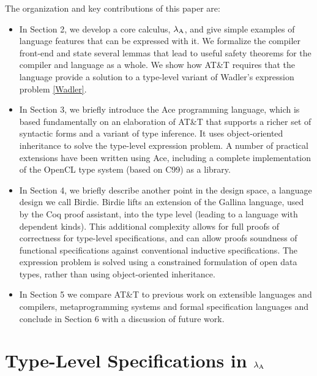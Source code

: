\documentclass[9pt]{sigplanconf}
\begin{document}
The organization and key contributions of this paper are:
\begin{itemize}
\item In Section 2, we develop a core calculus, $\lambda_{\text{A}}$, and give simple examples of language features that can be expressed with it. We formalize the compiler front-end and state several lemmas that lead to useful safety theorems for the compiler and language as a whole.  We show how AT\&T requires that the language provide a solution to a type-level variant of Wadler's expression problem \ref{Wadler}. 
\item In Section 3, we briefly introduce the Ace programming language, which is based fundamentally on an  elaboration of AT\&T that supports a richer set of syntactic forms and a variant of type inference. It uses object-oriented inheritance to solve the type-level expression problem. A number of practical extensions have been written using Ace, including a complete implementation of the OpenCL type system (based on C99) as a library.
\item In Section 4, we briefly describe another point in the design space, a language design we call Birdie. Birdie lifts an extension of the Gallina language, used by the Coq proof assistant, into the type level (leading to a language with dependent kinds). This additional complexity allows for full proofs of correctness for type-level specifications, and can allow proofs soundness of functional specifications against conventional inductive specifications. The expression problem is solved using a constrained formulation of open data types, rather than using object-oriented inheritance. 
\item In Section 5 we compare AT\&T to previous work on extensible languages and compilers, metaprogramming systems and formal specification languages and conclude in Section 6 with a discussion of future work.
\end{itemize}

\section{Type-Level Specifications in $\lambda_{\text{A}}$}
\end{document}

